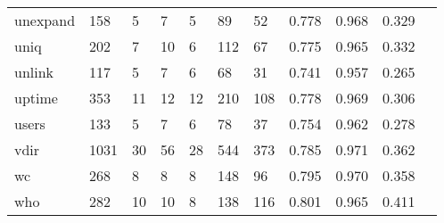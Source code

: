 \begin{longtable}{lp{1.10cm}p{1.10cm}p{1.10cm}p{1.10cm}p{1.10cm}p{1.10cm}p{1.10cm}p{1.10cm}p{1.10cm}p{1.10cm}}
unexpand  &                    158 &                                  5 &                                 7 &                                5 &                                89 &                              52 &                             0.778 &                                 0.968 &                               0.329 \\
uniq      &                    202 &                                  7 &                                10 &                                6 &                               112 &                              67 &                             0.775 &                                 0.965 &                               0.332 \\
unlink    &                    117 &                                  5 &                                 7 &                                6 &                                68 &                              31 &                             0.741 &                                 0.957 &                               0.265 \\
uptime    &                    353 &                                 11 &                                12 &                               12 &                               210 &                             108 &                             0.778 &                                 0.969 &                               0.306 \\
users     &                    133 &                                  5 &                                 7 &                                6 &                                78 &                              37 &                             0.754 &                                 0.962 &                               0.278 \\
vdir      &                   1031 &                                 30 &                                56 &                               28 &                               544 &                             373 &                             0.785 &                                 0.971 &                               0.362 \\
wc        &                    268 &                                  8 &                                 8 &                                8 &                               148 &                              96 &                             0.795 &                                 0.970 &                               0.358 \\
who       &                    282 &                                 10 &                                10 &                                8 &                               138 &                             116 &                             0.801 &                                 0.965 &                               0.411 \\

\end{longtable}
